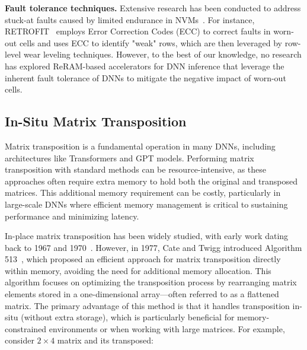
\textbf{Fault tolerance techniques.} Extensive research has been conducted to address stuck-at faults caused by limited endurance in NVMs~\cite{FLOWER_and_FaME,FREE-p,Data_Block,ECP}. For instance, RETROFIT~\cite{Realizing} employs Error Correction Codes (ECC) to correct faults in worn-out cells and uses ECC to identify "weak" rows, which are then leveraged by row-level wear leveling techniques. However, to the best of our knowledge, no research has explored ReRAM-based accelerators for DNN inference that leverage the inherent fault tolerance of DNNs to mitigate the negative impact of worn-out cells.


\subsection{In-Situ Matrix Transposition}\label{subs:Transposition}
Matrix transposition is a fundamental operation in many DNNs, including architectures like Transformers and GPT models. Performing matrix transposition with standard methods can be resource-intensive, as these approaches often require extra memory to hold both the original and transposed matrices. This additional memory requirement can be costly, particularly in large-scale DNNs where efficient memory management is critical to sustaining performance and minimizing latency. 

In-place matrix transposition has been widely studied, with early work dating back to 1967 and 1970~\cite{Algorithm_380,Algorithm_302}. However, in 1977, Cate and Twigg introduced Algorithm 513~\cite{Algorithm_513}, which proposed an efficient approach for matrix transposition directly within memory, avoiding the need for additional memory allocation. This algorithm focuses on optimizing the transposition process by rearranging matrix elements stored in a one-dimensional array—often referred to as a flattened matrix. The primary advantage of this method is that it handles transposition in-situ (without extra storage), which is particularly beneficial for memory-constrained environments or when working with large matrices. For example, consider $2\times4$ matrix and its transposed:

